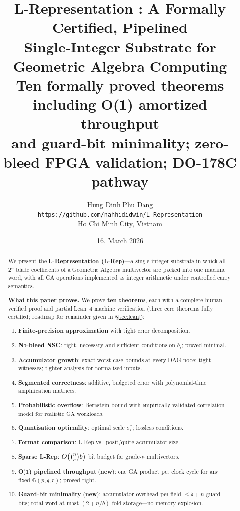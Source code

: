 \documentclass[11pt,a4paper]{article}
\title{\textbf{L-Representation : A Formally Certified, Pipelined\\
Single-Integer Substrate for Geometric Algebra Computing}\\[6pt]
\large Ten formally proved theorems including O(1) amortized throughput\\
and guard-bit minimality; zero-bleed FPGA validation; DO-178C pathway}
\author{Hung Dinh Phu Dang\\
\small \texttt{https://github.com/nahhididwin/L-Representation}\\
\small Ho Chi Minh City, Vietnam}
\date{16, March 2026}
\theoremstyle{definition}
\theoremstyle{plain}
\theoremstyle{remark}
\newcommand{\GA}{\mathbb{G}}
\begin{document}
\maketitle

\begin{abstract}
We present the \textbf{L-Representation (L-Rep)}---a
single-integer substrate in which all $2^n$ blade coefficients of a
Geometric Algebra multivector are packed into one machine word, with all
GA operations implemented as integer arithmetic under controlled carry
semantics.

\textbf{What this paper proves.}
We prove \textbf{ten theorems}, each with a complete human-verified proof
and partial Lean~4 machine verification (three core theorems fully
certified; roadmap for remainder given in \S\ref{sec:lean}):
\begin{enumerate}[leftmargin=*,label=T\arabic{enumi}.]
  \item \textbf{Finite-precision approximation} with tight error
        decomposition.
  \item \textbf{No-bleed NSC}: tight, necessary-and-sufficient conditions
        on $b_i$; proved minimal.
  \item \textbf{Accumulator growth}: exact worst-case bounds at every DAG
        node; tight witnesses; tighter analysis for normalised inputs.
  \item \textbf{Segmented correctness}: additive, budgeted error with
        polynomial-time amplification matrices.
  \item \textbf{Probabilistic overflow}: Bernstein bound with empirically
        validated correlation model for realistic GA workloads.
  \item \textbf{Quantisation optimality}: optimal scale $\sigma_i^*$;
        lossless conditions.
  \item \textbf{Format comparison}: L-Rep vs.\ posit/quire accumulator
        size.
  \item \textbf{Sparse L-Rep}: $O\!\left(\tbinom{n}{\kappa}b\right)$
        bit budget for grade-$\kappa$ multivectors.
  \item \textbf{O(1) pipelined throughput} (\textbf{new}):
        one GA product per clock cycle for any fixed
        $\GA(p,q,r)$; proved tight.
  \item \textbf{Guard-bit minimality} (\textbf{new}):
        accumulator overhead per field $\le b+n$ guard bits;
        total word at most $(2+n/b)$-fold storage---no memory explosion.
\end{enumerate}


\end{abstract}
\end{document}
